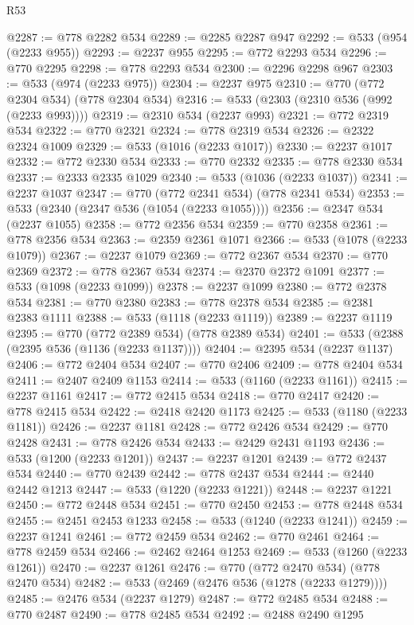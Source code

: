 \begin{lexlean}{R53}
\begin{coremodule}
@2287 := @778 @2282 @534
@2289 := @2285 @2287 @947
@2292 := @533 (@954 (@2233 @955))
@2293 := @2237 @955
@2295 := @772 @2293 @534
@2296 := @770 @2295
@2298 := @778 @2293 @534
@2300 := @2296 @2298 @967
@2303 := @533 (@974 (@2233 @975))
@2304 := @2237 @975
@2310 := @770 (@772 @2304 @534) (@778 @2304 @534)
@2316 := @533 (@2303 (@2310 @536 (@992 (@2233 @993))))
@2319 := @2310 @534 (@2237 @993)
@2321 := @772 @2319 @534
@2322 := @770 @2321
@2324 := @778 @2319 @534
@2326 := @2322 @2324 @1009
@2329 := @533 (@1016 (@2233 @1017))
@2330 := @2237 @1017
@2332 := @772 @2330 @534
@2333 := @770 @2332
@2335 := @778 @2330 @534
@2337 := @2333 @2335 @1029
@2340 := @533 (@1036 (@2233 @1037))
@2341 := @2237 @1037
@2347 := @770 (@772 @2341 @534) (@778 @2341 @534)
@2353 := @533 (@2340 (@2347 @536 (@1054 (@2233 @1055))))
@2356 := @2347 @534 (@2237 @1055)
@2358 := @772 @2356 @534
@2359 := @770 @2358
@2361 := @778 @2356 @534
@2363 := @2359 @2361 @1071
@2366 := @533 (@1078 (@2233 @1079))
@2367 := @2237 @1079
@2369 := @772 @2367 @534
@2370 := @770 @2369
@2372 := @778 @2367 @534
@2374 := @2370 @2372 @1091
@2377 := @533 (@1098 (@2233 @1099))
@2378 := @2237 @1099
@2380 := @772 @2378 @534
@2381 := @770 @2380
@2383 := @778 @2378 @534
@2385 := @2381 @2383 @1111
@2388 := @533 (@1118 (@2233 @1119))
@2389 := @2237 @1119
@2395 := @770 (@772 @2389 @534) (@778 @2389 @534)
@2401 := @533 (@2388 (@2395 @536 (@1136 (@2233 @1137))))
@2404 := @2395 @534 (@2237 @1137)
@2406 := @772 @2404 @534
@2407 := @770 @2406
@2409 := @778 @2404 @534
@2411 := @2407 @2409 @1153
@2414 := @533 (@1160 (@2233 @1161))
@2415 := @2237 @1161
@2417 := @772 @2415 @534
@2418 := @770 @2417
@2420 := @778 @2415 @534
@2422 := @2418 @2420 @1173
@2425 := @533 (@1180 (@2233 @1181))
@2426 := @2237 @1181
@2428 := @772 @2426 @534
@2429 := @770 @2428
@2431 := @778 @2426 @534
@2433 := @2429 @2431 @1193
@2436 := @533 (@1200 (@2233 @1201))
@2437 := @2237 @1201
@2439 := @772 @2437 @534
@2440 := @770 @2439
@2442 := @778 @2437 @534
@2444 := @2440 @2442 @1213
@2447 := @533 (@1220 (@2233 @1221))
@2448 := @2237 @1221
@2450 := @772 @2448 @534
@2451 := @770 @2450
@2453 := @778 @2448 @534
@2455 := @2451 @2453 @1233
@2458 := @533 (@1240 (@2233 @1241))
@2459 := @2237 @1241
@2461 := @772 @2459 @534
@2462 := @770 @2461
@2464 := @778 @2459 @534
@2466 := @2462 @2464 @1253
@2469 := @533 (@1260 (@2233 @1261))
@2470 := @2237 @1261
@2476 := @770 (@772 @2470 @534) (@778 @2470 @534)
@2482 := @533 (@2469 (@2476 @536 (@1278 (@2233 @1279))))
@2485 := @2476 @534 (@2237 @1279)
@2487 := @772 @2485 @534
@2488 := @770 @2487
@2490 := @778 @2485 @534
@2492 := @2488 @2490 @1295

\end{coremodule}
\end{lexlean}
